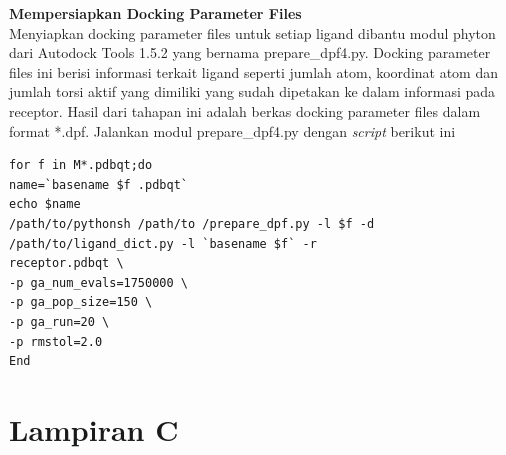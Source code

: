 \noindent \textbf{Mempersiapkan Docking Parameter Files} \\
Menyiapkan docking parameter files untuk setiap ligand dibantu modul phyton dari Autodock Tools 1.5.2 yang bernama prepare\_dpf4.py. Docking parameter files ini berisi informasi terkait ligand seperti jumlah atom, koordinat
atom dan jumlah torsi aktif yang dimiliki yang sudah dipetakan ke dalam informasi pada receptor. Hasil dari tahapan ini adalah berkas docking parameter files dalam format *.dpf. Jalankan modul prepare\_dpf4.py dengan \textit{script} berikut ini
\begin{lstlisting}[caption=\textit{script} untuk mempersiapkan docking parameter file]
for f in M*.pdbqt;do
name=`basename $f .pdbqt`
echo $name
/path/to/pythonsh /path/to /prepare_dpf.py -l $f -d
/path/to/ligand_dict.py -l `basename $f` -r
receptor.pdbqt \
-p ga_num_evals=1750000 \
-p ga_pop_size=150 \
-p ga_run=20 \
-p rmstol=2.0
End
\end{lstlisting}

\chapter*{Lampiran C}

